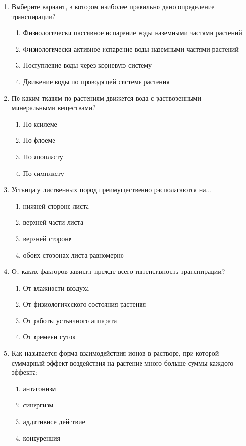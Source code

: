\begin{enumerate}
\item Выберите вариант, в котором наиболее правильно дано определение транспирации?
\begin{enumerate}
	\item Физиологически пассивное испарение воды наземными частями растений
	\item Физиологически активное испарение воды наземными частями растений
	\item Поступление воды через корневую систему
	\item Движение воды по проводящей системе растения
\end{enumerate}

\item По каким тканям по растениям движется вода с растворенными минеральными веществами?
\begin{enumerate}
	\item По ксилеме      
	\item По флоеме
	\item По апопласту  
	\item По симпласту
\end{enumerate}

\item Устьица у лиственных пород преимущественно располагаются на...
\begin{enumerate}
	\item нижней стороне листа  
	\item верхней части листа
	\item верхней стороне            
	\item обоих сторонах листа равномерно
\end{enumerate}

\item От каких факторов зависит прежде всего интенсивность транспирации?
\begin{enumerate}
	\item От влажности воздуха    
	\item От физиологического состояния растения
	\item От работы устьичного аппарата 
	\item От времени суток
\end{enumerate}

\item Как называется форма взаимодействия ионов в растворе, при которой суммарный эффект воздействия на растение много больше суммы каждого эффекта:
\begin{enumerate}
	\item антагонизм                      
	\item синергизм
	\item аддитивное действие      
	\item конкуренция
\end{enumerate}

\end{enumerate}

